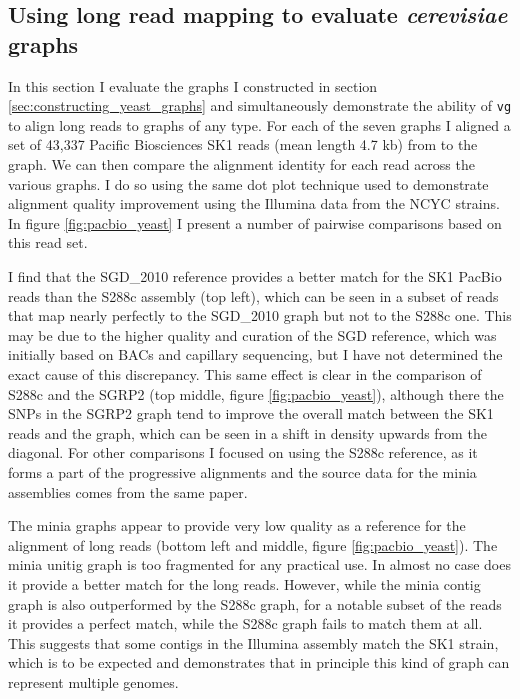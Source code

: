 \subsection{Using long read mapping to evaluate \emph{cerevisiae} graphs} %
\label{sec:yeast_long_read}

In this section I evaluate the graphs I constructed in section \ref{sec:constructing_yeast_graphs} and simultaneously demonstrate the ability of {\tt vg} to align long reads to graphs of any type.
For each of the seven graphs I aligned a set of 43,337 Pacific Biosciences SK1 reads (mean length 4.7 kb) from \cite{yue2017contrasting} to the graph.
We can then compare the alignment identity for each read across the various graphs.
I do so using the same dot plot technique used to demonstrate alignment quality improvement using the Illumina data from the NCYC strains.
In figure \ref{fig:pacbio_yeast} I present a number of pairwise comparisons based on this read set.

I find that the SGD\_2010 reference provides a better match for the SK1 PacBio reads than the S288c assembly (top left), which can be seen in a subset of reads that map nearly perfectly to the SGD\_2010 graph but not to the S288c one.
This may be due to the higher quality and curation of the SGD reference, which was initially based on BACs and capillary sequencing, but I have not determined the exact cause of this discrepancy.
This same effect is clear in the comparison of S288c and the SGRP2 (top middle, figure \ref{fig:pacbio_yeast}), although there the SNPs in the SGRP2 graph tend to improve the overall match between the SK1 reads and the graph, which can be seen in a shift in density upwards from the diagonal.
For other comparisons I focused on using the S288c reference, as it forms a part of the progressive alignments and the source data for the minia assemblies comes from the same paper.

The minia graphs appear to provide very low quality as a reference for the alignment of long reads (bottom left and middle, figure \ref{fig:pacbio_yeast}).
The minia unitig graph is too fragmented for any practical use.
In almost no case does it provide a better match for the long reads.
However, while the minia contig graph is also outperformed by the S288c graph, for a notable subset of the reads it provides a perfect match, while the S288c graph fails to match them at all.
This suggests that some contigs in the Illumina assembly match the SK1 strain, which is to be expected and demonstrates that in principle this kind of graph can represent multiple genomes.


